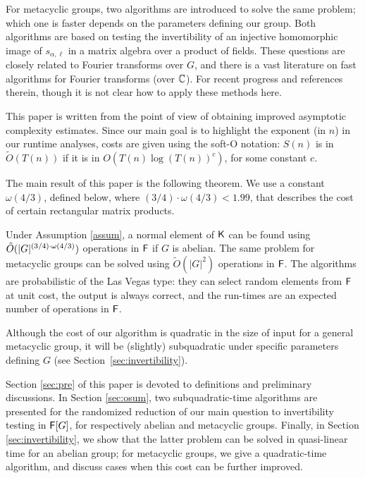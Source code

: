 For metacyclic groups, two algorithms are introduced to solve the same
problem; which one is faster depends on the parameters defining our
group. Both algorithms are based on testing the invertibility of an
injective homomorphic image of $s_{\alpha,\ell}$ in a matrix algebra over a
product of fields. These questions are closely related to Fourier
transforms over $G$, and there is a vast literature on fast algorithms for
Fourier transforms (over $\mathbb{C}$). For recent progress
\cite{ClaMu04,MaRockWol18} and references therein, though it is not clear
how to apply these methods here.

This paper is written from the point of view of obtaining improved
asymptotic complexity estimates. Since our main goal is to highlight
the exponent (in $n$) in our runtime analyses, costs are given using
the soft-O notation: $S(n)$ is in $\tilde{O}(T(n))$ if it is in
$O(T(n) \log(T(n))^c)$, for some constant $c$.

The main result of this paper is the following theorem.  We use a constant
$\omega(4/3)$, defined below, where $(3/4)\cdot\omega(4/3)<1.99$, that
describes the cost of certain rectangular matrix products.

\begin{theorem}
  \label{thm:main}
  Under Assumption \ref{assum}, a normal element of ${\mathsf{K}}$ can be found using
  $\tilde{O}(\vert G \vert ^{(3/4)\cdot \omega(4/3)})$ operations in ${\mathsf{F}}$ if $G$ is abelian.  The same problem for
  metacyclic groups can be solved using $\tilde{O}(\vert G \vert^2)$
  operations in ${\mathsf{F}}$. The algorithms are probabilistic of the Las Vegas
  type: they can select random elements from ${\mathsf{F}}$ at unit
  cost, the output is always correct, and the run-times are an expected
  number of operations in ${\mathsf{F}}$.
\end{theorem}

Although the cost of our algorithm is quadratic in the size of input for a
general metacyclic group, it will be (slightly) subquadratic under specific
parameters defining $G$ (see Section~\ref{sec:invertibility}).

Section \ref{sec:pre} of this paper is devoted to definitions and
preliminary discussions.  In Section \ref{sec:osum}, two
subquadratic-time algorithms are presented for the randomized reduction
of our main question to invertibility testing in ${\mathsf{F}}[G]$, for
respectively abelian and metacyclic groups.  Finally, in Section
\ref{sec:invertibility}, we show that the latter problem can be solved
in quasi-linear time for an abelian group; for metacyclic
groups, we give a quadratic-time algorithm, and discuss cases when
this cost can be further improved.

